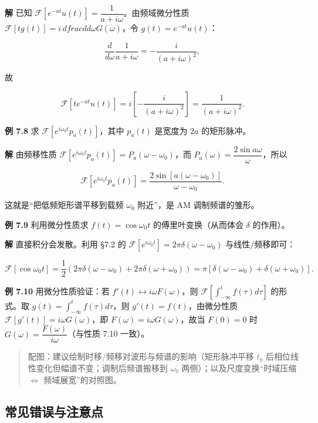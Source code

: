 \textbf{解} 已知
\(\mathcal F\left[e^{-at}u(t)\right]=\dfrac{1}{a+i\omega}\)。由频域微分性质
\(\mathcal F[t g(t)]=i\,dfrac{d}{d\omega}G(\omega)\)，令
\(g(t)=e^{-at}u(t)\)：

\[
\frac{d}{d\omega}\frac{1}{a+i\omega}=-\frac{i}{(a+i\omega)^2},
\]

故

\[
\mathcal F\left[t e^{-at}u(t)\right]=i\left[-\frac{i}{(a+i\omega)^2}\right]=\frac{1}{(a+i\omega)^2}.
\]

\textbf{例 7.8} 求
\(\mathcal F\left[e^{i\omega_0 t}p_a(t)\right]\)，其中 \(p_a(t)\)
是宽度为 \(2a\) 的矩形脉冲。

\textbf{解} 由频移性质
\(\mathcal F\left[e^{i\omega_0 t}p_a(t)\right]=P_a(\omega-\omega_0)\)，而
\(P_a(\omega)=\dfrac{2\sin a\omega}{\omega}\)，所以

\[
\mathcal F\left[e^{i\omega_0 t}p_a(t)\right]=\frac{2\sin[a(\omega-\omega_0)]}{\omega-\omega_0}.
\]

这就是``把低频矩形谱平移到载频 \(\omega_0\) 附近''，是 AM
调制频谱的雏形。

\textbf{例 7.9} 利用微分性质求 \(f(t)=\cos\omega_0 t\)
的傅里叶变换（从而体会 \(\delta\) 的作用）。

\textbf{解} 直接积分会发散。利用 §7.2 的
\(\mathcal F[e^{i\omega_0 t}]=2\pi\delta(\omega-\omega_0)\)
与线性/频移即可：

\[
\mathcal F[\cos\omega_0 t]=\frac{1}{2}\left(2\pi\delta(\omega-\omega_0)+2\pi\delta(\omega+\omega_0)\right)
=\pi\left[\delta(\omega-\omega_0)+\delta(\omega+\omega_0)\right].
\]

\textbf{例 7.10} 用微分性质验证：若
\(f'(t)\leftrightarrow i\omega F(\omega)\)，则
\(\mathcal F\left[\int_{-\infty}^{t}f(\tau)d\tau\right]\) 的形式。取
\(g(t)=\int_{-\infty}^{t}f(\tau)d\tau\)，则 \(g'(t)=f(t)\)，由微分性质
\(\mathcal F[g'(t)]=i\omega G(\omega)\)，即
\(F(\omega)=i\omega G(\omega)\)，故当 \(F(0)=0\) 时
\(G(\omega)=\dfrac{F(\omega)}{i\omega}\)（与性质 7.10 一致）。

\begin{quote}
配图：建议绘制时移/频移对波形与频谱的影响（矩形脉冲平移 \(t_0\)
后相位线性变化但幅谱不变；调制后频谱搬移到 \(\omega_0\)
两侧）；以及尺度变换``时域压缩 \(\Longleftrightarrow\)
频域展宽''的对照图。
\end{quote}

\subsection{常见错误与注意点}\label{ux5e38ux89c1ux9519ux8befux4e0eux6ce8ux610fux70b9-19}

